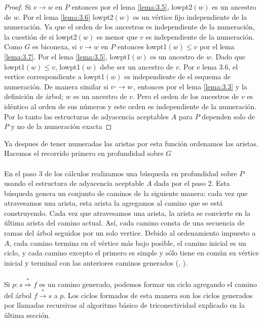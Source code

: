 \begin{proof}
Si $v \rightarrow w$ en $P$ entonces por el lema \ref{lema:3.5}, lowpt2$\left(w\right)$ es un ancestro de $w$. Por el lema \ref{lema:3.6} lowpt2$\left(w\right)$ es un vértice fijo independiente de la numeración. Ya que el orden de los ancestros es independiente de la numeración, la cuestión de si lowpt2$\left(w\right)$ es menor que $v$ es independiente de la numeración. Como $G$ es biconexa, si $v \rightarrow w$ en $P$ entonces lowpt1$\left(w\right) \leq v$ por el lema \ref{lema:3.7}. Por el lema \ref{lema:3.5}, lowpt1$\left(w\right)$ es un ancestro de $w$. Dado que lowpt1$\left(w\right) \leq v$, lowpt1$\left(w\right)$ debe ser un ancestro de $v$. Por e lema 3.6, el vertice correspondiente a lowpt1$\left(w\right)$ es independiente de el esquema de numeración. De manera similar si $v \rule[1mm]{.1cm}{0.4pt} \rightarrow w$, entonces por el lema \ref{lema:3.3} y la definición de árbol; $w$ es un ancestro de $v$. Pero el orden de los ancestros de $v$ es idéntico al orden de sus números y este orden es independiente de la numeración. Por lo tanto las estructuras de adyacencia aceptables $A$ para $P$ dependen solo de $P$ y no de la numeración exacta
\end{proof}

Ya despues de tener numeradas las aristas por esta función ordenamos las aristas. Hacemos el recorrido primero en profundidad sobre $G$\\

\paragraph{}
En el paso 3 de los cálculos realizamos una búsqueda en profundidad sobre $P$ usando el estructura de adyacencia aceptable $A$ dada por el paso 2. Esta búsqueda genera un conjunto de caminos de la siguiente manera: cada vez que atravesamos una arista, esta arista la agregamos al  camino que se está construyendo. Cada vez que atravesamos una arista, la arista se convierte en la última arista del camino actual. Así, cada camino consta de una secuencia de ramas del árbol seguidos por un solo vertice. Debido al ordenamiento impuesto a $A$, cada camino termina en el vértice más bajo posible, el camino inicial es un ciclo, y cada camino excepto el primero es simple y sólo tiene en común su vértice inicial y terminal con las anteriores caminos generados (\citep{ept}, \citep{tarjan1971efficient}).

\paragraph{}
Si $p: s \overset{\ast}{\Rightarrow} f$ es un camino generado, podemos formar un ciclo agregando el camino del árbol $f \overset{\ast}{\rightarrow} s$ a $p$. Los ciclos formados de esta manera son los ciclos generados por llamadas recursivas al algoritmo básico de triconectividad explicado en la última sección.

